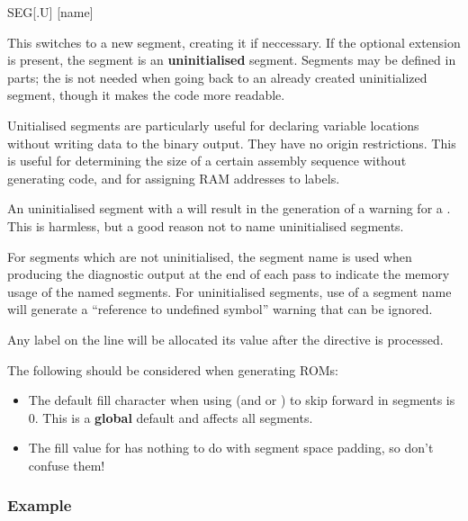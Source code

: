 \begin{usage}
  SEG[.U] [name]
\end{usage}

This switches to a new segment, creating it if neccessary.  If the optional  extension is present, the segment is an \textbf{uninitialised} segment. Segments may be defined in parts; the  is not needed when going back to an already created uninitialized segment, though it makes the code more readable.

Unitialised segments are particularly useful for declaring variable locations without writing data to the binary output. They have no origin restrictions. This is useful for determining the size of a certain assembly sequence without generating code, and for assigning RAM addresses to labels.

An uninitialised segment with a  will result in the generation of a warning for a . This is harmless, but a good reason not to name uninitialised segments.

For segments which are not uninitialised, the segment name is used when producing the diagnostic output at the end of each pass to indicate the memory usage of the named segments. For uninitialised segments, use of a segment name will generate a ``reference to undefined symbol'' warning that can be ignored.

Any label on the  line will be allocated its value after the directive is processed.

The following should be considered when generating ROMs:

\begin{itemize}
	\item The default fill character when using  (and   or ) to
	skip forward in segments is 0. This is a \textbf{global} default and affects all segments.
	\item The fill value for  has nothing to do with segment space padding, so don't confuse them!
\end{itemize}

\subsubsection{Example}


